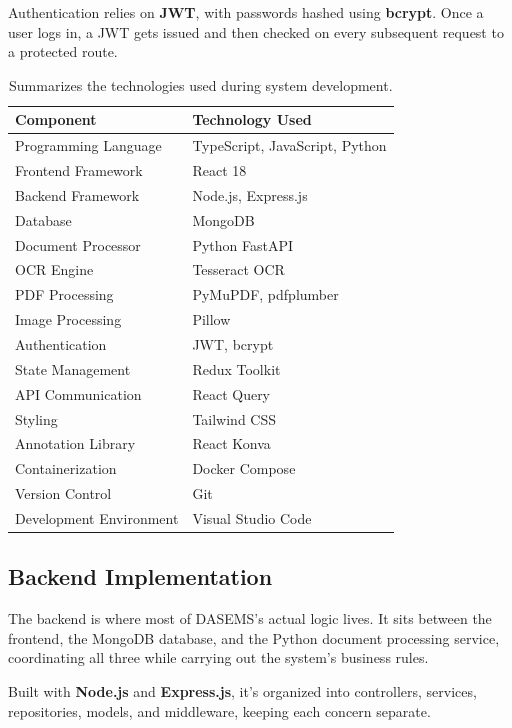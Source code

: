 Authentication relies on \textbf{JWT}, with passwords hashed using \textbf{bcrypt}. Once a user logs in, a JWT gets issued and then checked on every subsequent request to a protected route.

\begin{table}[ht]
\centering
\caption{Summarizes the technologies used during system development.}
\label{tab:development_environment}

\begin{tabular}{|p{5cm}|p{7cm}|}
\hline
\textbf{Component} & \textbf{Technology Used} \\
\hline
Programming Language & TypeScript, JavaScript, Python \\
\hline
Frontend Framework & React 18 \\
\hline
Backend Framework & Node.js, Express.js \\
\hline
Database & MongoDB \\
\hline
Document Processor & Python FastAPI \\
\hline
OCR Engine & Tesseract OCR \\
\hline
PDF Processing & PyMuPDF, pdfplumber \\
\hline
Image Processing & Pillow \\
\hline
Authentication & JWT, bcrypt \\
\hline
State Management & Redux Toolkit \\
\hline
API Communication & React Query \\
\hline
Styling & Tailwind CSS \\
\hline
Annotation Library & React Konva \\
\hline
Containerization & Docker Compose \\
\hline
Version Control & Git \\
\hline
Development Environment & Visual Studio Code \\
\hline
\end{tabular}
\end{table}

\subsection{Backend Implementation}

The backend is where most of DASEMS's actual logic lives. It sits between the frontend, the MongoDB database, and the Python document processing service, coordinating all three while carrying out the system's business rules.

Built with \textbf{Node.js} and \textbf{Express.js}, it's organized into controllers, services, repositories, models, and middleware, keeping each concern separate.

